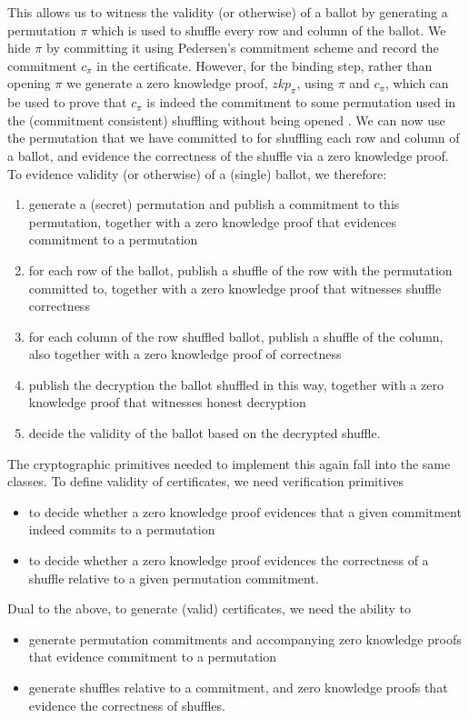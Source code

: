 \noindent
This allows us to witness the validity (or otherwise) of a ballot by generating a 
permutation $\pi$ which is used to shuffle every row and column of the ballot.
We hide $\pi$ by committing it using Pedersen's 
commitment scheme 
and record the commitment $c_{\pi}$ in the certificate. However, for the binding step, rather 
than opening $\pi$ we generate a zero knowledge proof, $zkp_{\pi}$, 
using $\pi$ and $c_{\pi}$, which can 
be  used to prove that $c_{\pi}$ is indeed the commitment to some permutation
used in the (commitment consistent) shuffling 
 without being opened \cite{Wikstrom:2009:CPS}. We can now use the
 permutation that we have committed to for 
shuffling each row and column of a ballot, and evidence the
correctness of the shuffle via a zero knowledge proof.
%
To evidence validity (or otherwise) of a (single) ballot, we
therefore:
\begin{enumerate}
  \item generate a (secret) permutation and publish a commitment to this
  permutation, together with a zero knowledge proof that evidences commitment
  to a permutation
  \item for each row of the ballot, publish a shuffle of the row with
  the permutation committed to, together with a zero knowledge proof
  that witnesses shuffle correctness
  \item for each column of the row shuffled ballot, publish a
  shuffle of the column, also together with a zero knowledge proof of
  correctness 
  \item publish the decryption the ballot shuffled in this way, together with a
  zero knowledge proof that witnesses honest decryption
  \item decide the validity of the ballot based on the decrypted
  shuffle.
\end{enumerate}

\noindent
The cryptographic primitives needed to implement this again fall
into the same classes. To define validity of certificates, we need
verification primitives
\begin{itemize}
  \item to decide whether a zero knowledge proof evidences that a
  given commitment indeed commits to a permutation 
  \item to decide whether a zero knowledge proof evidences the
  correctness of a shuffle relative to a given permutation
  commitment.
\end{itemize}

\noindent
Dual to the above, to generate (valid) certificates, we need the
ability to
\begin{itemize}
  \item generate permutation commitments and accompanying zero
  knowledge proofs that evidence commitment to a permutation
  \item generate shuffles relative to a commitment, and zero
  knowledge proofs that evidence the correctness of shuffles.
\end{itemize}

